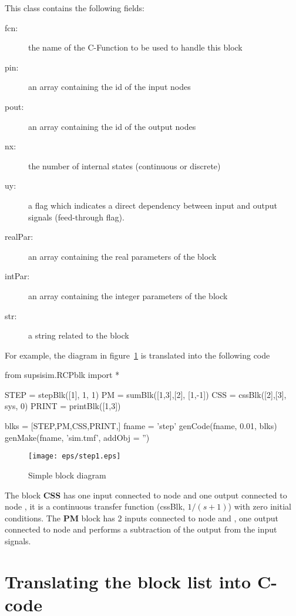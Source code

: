 This class contains the following fields:

\begin{description}
\item[fcn:] the name of the C-Function to be used to handle this block
\item [pin:] an array containing the id of the input nodes
\item [pout:] an array containing the id of the output nodes
\item [nx:] the number of internal states (continuous or discrete)
\item [uy:] a flag which indicates a direct dependency between input and 
output signals (feed-through flag).
\item [realPar:] an array containing the real parameters of the block
\item [intPar:] an array containing the integer parameters of the block
\item [str:] a string related to the block
\end{description}

For example, the diagram in figure~\ref{F18} is translated into the following 
code

\begin{code}
from supsisim.RCPblk import *

STEP = stepBlk([1],  1,  1)
PM = sumBlk([1,3],[2],  [1,-1])
CSS = cssBlk([2],[3],  sys,  0)
PRINT = printBlk([1,3])

blks = [STEP,PM,CSS,PRINT,]
fname = 'step'
genCode(fname, 0.01, blks)
genMake(fname, 'sim.tmf', addObj = '')
\end{code}



\begin{figure}[htbp]	%
\centering
\texttt{[image: eps/step1.eps]}
\caption{Simple block diagram}
\label{F18}
\end{figure}

The block \textbf{CSS} has one input connected to node  and 
one output connected to node , it is a continuous transfer function 
(cssBlk, $1/(s+1)$) with zero initial conditions. The \textbf{PM} block has 
2 inputs connected to node  and , one output 
connected to node  and performs a subtraction of the output from the 
input signals.

\section{Translating the block list into C-code}
